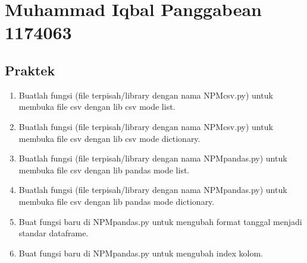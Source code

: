 \section{Muhammad Iqbal Panggabean 1174063}
\subsection{Praktek}
\begin{enumerate}
	\item Buatlah  fungsi  (file  terpisah/library  dengan  nama  NPMcsv.py)  untuk  membuka file csv dengan lib csv mode list.
	
	
	
	\item Buatlah  fungsi  (file  terpisah/library  dengan  nama  NPMcsv.py)  untuk  membuka file csv dengan lib csv mode dictionary.
	
	
	
	\item Buatlah fungsi (file terpisah/library dengan nama NPMpandas.py) untuk membuka file csv dengan lib pandas mode list.
	
	
	
	\item Buatlah fungsi (file terpisah/library dengan nama NPMpandas.py) untuk membuka file csv dengan lib pandas mode dictionary.
	
	
	
	\item  Buat fungsi baru di NPMpandas.py untuk mengubah format tanggal menjadi standar dataframe.
	
	
	
	\item Buat fungsi baru di NPMpandas.py untuk mengubah index kolom.
	
	
	

\end{enumerate}
